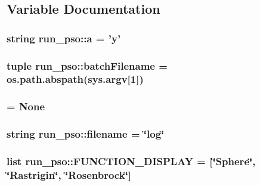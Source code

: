\subsection{Variable Documentation}
\hypertarget{namespacerun__pso_1068caf66dddb9aea4f3b251202394fa}{
\subsubsection{\setlength{\rightskip}{0pt plus 5cm}string {\bf run\_\-pso::a} = 'y'}}
\label{namespacerun__pso_1068caf66dddb9aea4f3b251202394fa}


\hypertarget{namespacerun__pso_0a19a9c4b6d7295cdcaa2091daa6037b}{
\subsubsection{\setlength{\rightskip}{0pt plus 5cm}tuple {\bf run\_\-pso::batchFilename} = os.path.abspath(sys.argv\mbox{[}1\mbox{]})}}
\label{namespacerun__pso_0a19a9c4b6d7295cdcaa2091daa6037b}


\hypertarget{namespacerun__pso_67b81a80e48c592be44a6e4a2db0a269}{
\subsubsection{ = None}}
\label{namespacerun__pso_67b81a80e48c592be44a6e4a2db0a269}


\hypertarget{namespacerun__pso_4b57080cd7d11065fe404d7d6dd182a1}{
\subsubsection{\setlength{\rightskip}{0pt plus 5cm}string {\bf run\_\-pso::filename} = \char`\"{}log\char`\"{}}}
\label{namespacerun__pso_4b57080cd7d11065fe404d7d6dd182a1}


\hypertarget{namespacerun__pso_282736b723eff4e6a6abb2e88cfe168e}{
\subsubsection{\setlength{\rightskip}{0pt plus 5cm}list {\bf run\_\-pso::FUNCTION\_\-DISPLAY} = \mbox{[}\char`\"{}Sphere\char`\"{}, \char`\"{}{\bf Rastrigin}\char`\"{}, \char`\"{}{\bf Rosenbrock}\char`\"{}\mbox{]}}}
\label{namespacerun__pso_282736b723eff4e6a6abb2e88cfe168e}


